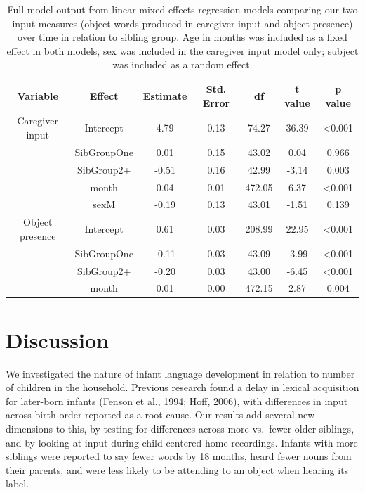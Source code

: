\documentclass[
  english,
  man,floatsintext]{apa6}
\begin{document}
\begin{longtable}[t]{ccccccc}
\caption{\label{tab:table-input-model-summary}Full model output from linear mixed effects regression models comparing our two input measures (object words produced in caregiver input and object presence) over time in relation to sibling group. Age in months was included as a fixed effect in both models, sex was included in the caregiver input model only; subject was included as a random effect.}\\
\toprule
Variable & Effect & Estimate & Std. Error & df & t value & p value\\
\midrule
Caregiver input & Intercept & 4.79 & 0.13 & 74.27 & 36.39 & <0.001\\
 & SibGroupOne & 0.01 & 0.15 & 43.02 & 0.04 & 0.966\\
 & SibGroup2+ & -0.51 & 0.16 & 42.99 & -3.14 & 0.003\\
 & month & 0.04 & 0.01 & 472.05 & 6.37 & <0.001\\
 & sexM & -0.19 & 0.13 & 43.01 & -1.51 & 0.139\\
\midrule
\addlinespace
Object presence & Intercept & 0.61 & 0.03 & 208.99 & 22.95 & <0.001\\
 & SibGroupOne & -0.11 & 0.03 & 43.09 & -3.99 & <0.001\\
 & SibGroup2+ & -0.20 & 0.03 & 43.00 & -6.45 & <0.001\\
 & month & 0.01 & 0.00 & 472.15 & 2.87 & 0.004\\
\bottomrule
\end{longtable}

\hypertarget{discussion}{%
\section{Discussion}\label{discussion}}

We investigated the nature of infant language development in relation to number of children in the household. Previous research found a delay in lexical acquisition for later-born infants (Fenson et al., 1994; Hoff, 2006), with differences in input across birth order reported as a root cause. Our results add several new dimensions to this, by testing for differences across more vs.~fewer older siblings, and by looking at input during child-centered home recordings. Infants with more siblings were reported to say fewer words by 18 months, heard fewer nouns from their parents, and were less likely to be attending to an object when hearing its label.
\end{document}
